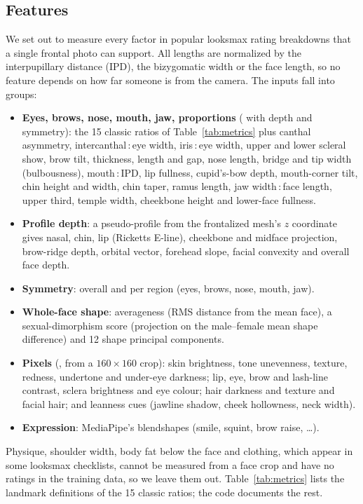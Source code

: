 \documentclass[sigconf,nonacm]{acmart}
\begin{document}
\subsection{Features}
\label{sec:features}
We set out to measure every factor in popular looksmax rating breakdowns that a single frontal photo can
support. All lengths are normalized by the interpupillary distance (IPD), the bizygomatic width or the face
length, so no feature depends on how far someone is from the camera. The \nFeatures{} inputs fall into
\nGroups{} groups:
\begin{itemize}[leftmargin=*,nosep]
  \item \textbf{Eyes, brows, nose, mouth, jaw, proportions} (\nGeometry{} with depth and symmetry): the 15 classic
        ratios of Table~\ref{tab:metrics} plus canthal asymmetry, intercanthal\,:\,eye width, iris\,:\,eye width,
        upper and lower scleral show, brow tilt, thickness, length and gap, nose length, bridge and tip width
        (bulbousness), mouth\,:\,IPD, lip fullness, cupid's-bow depth, mouth-corner tilt, chin height and width,
        chin taper, ramus length, jaw width\,:\,face length, upper third, temple width, cheekbone height and
        lower-face fullness.
  \item \textbf{Profile depth}: a pseudo-profile from the frontalized mesh's $z$ coordinate gives nasal, chin, lip
        (Ricketts E-line), cheekbone and midface projection, brow-ridge depth, orbital vector, forehead slope,
        facial convexity and overall face depth.
  \item \textbf{Symmetry}: overall and per region (eyes, brows, nose, mouth, jaw).
  \item \textbf{Whole-face shape}: averageness (RMS distance from the mean face), a sexual-dimorphism score
        (projection on the male--female mean shape difference) and 12 shape principal components.
  \item \textbf{Pixels} (\nPixel{}, from a $160{\times}160$ crop): skin brightness, tone unevenness, texture, redness,
        undertone and under-eye darkness; lip, eye, brow and lash-line contrast, sclera brightness and eye
        colour; hair darkness and texture and facial hair; and leanness cues (jawline shadow, cheek hollowness,
        neck width).
  \item \textbf{Expression}: MediaPipe's \nExpression{} blendshapes (smile, squint, brow raise, \dots).
\end{itemize}
Physique, shoulder width, body fat below the face and clothing, which appear in some looksmax checklists,
cannot be measured from a face crop and have no ratings in the training data, so we leave them out.
Table~\ref{tab:metrics} lists the landmark definitions of the 15 classic ratios; the code documents the rest.
\end{document}
